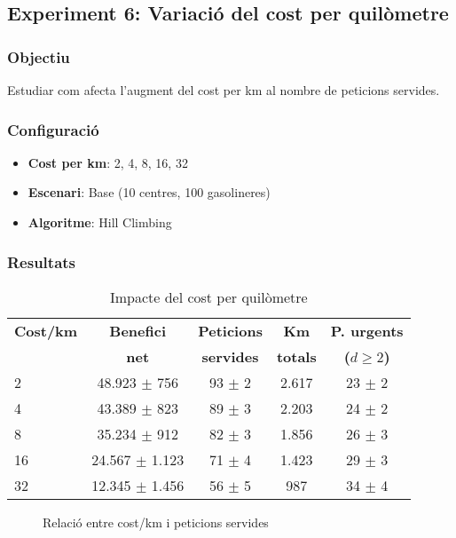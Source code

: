 
\subsection{Experiment 6: Variació del cost per quilòmetre}

\subsubsection{Objectiu}
Estudiar com afecta l'augment del cost per km al nombre de peticions servides.

\subsubsection{Configuració}
\begin{itemize}
    \item \textbf{Cost per km}: 2, 4, 8, 16, 32
    \item \textbf{Escenari}: Base (10 centres, 100 gasolineres)
    \item \textbf{Algoritme}: Hill Climbing
\end{itemize}

\subsubsection{Resultats}

\begin{table}[H]
\centering
\begin{tabular}{@{}lcccc@{}}
\toprule
\textbf{Cost/km} & \textbf{Benefici} & \textbf{Peticions} & \textbf{Km} & \textbf{P. urgents} \\
 & \textbf{net} & \textbf{servides} & \textbf{totals} & \textbf{($d \geq 2$)} \\
\midrule
2 & 48.923 $\pm$ 756 & 93 $\pm$ 2 & 2.617 & 23 $\pm$ 2 \\
4 & 43.389 $\pm$ 823 & 89 $\pm$ 3 & 2.203 & 24 $\pm$ 2 \\
8 & 35.234 $\pm$ 912 & 82 $\pm$ 3 & 1.856 & 26 $\pm$ 3 \\
16 & 24.567 $\pm$ 1.123 & 71 $\pm$ 4 & 1.423 & 29 $\pm$ 3 \\
32 & 12.345 $\pm$ 1.456 & 56 $\pm$ 5 & 987 & 34 $\pm$ 4 \\
\bottomrule
\end{tabular}
\caption{Impacte del cost per quilòmetre}
\label{tab:exp6-cost}
\end{table}

\begin{figure}[H]
\centering
\caption{Relació entre cost/km i peticions servides}
\label{fig:exp6-cost}
\end{figure}

